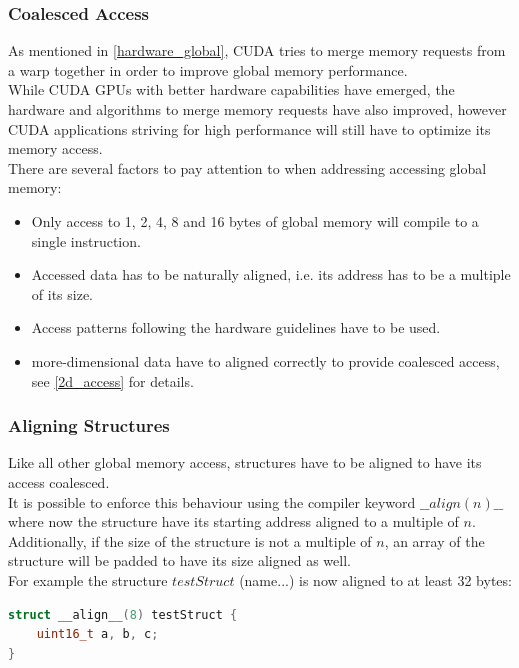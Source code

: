 \subsubsection{Coalesced Access}
As mentioned in \ref{hardware_global}, CUDA tries to merge memory requests from a warp together in order to improve global memory performance.\\
While CUDA GPUs with better hardware capabilities have emerged, the hardware and algorithms to merge memory requests have also improved,
however CUDA applications striving for high performance will still have to optimize its memory access.\\
There are several factors to pay attention to when addressing accessing global memory:\\
\begin{itemize}
    \item Only access to 1, 2, 4, 8 and 16 bytes of global memory will compile to a single instruction.
    \item Accessed data has to be naturally aligned, i.e. its address has to be a multiple of its size.
    \item Access patterns following the hardware guidelines have to be used.
    \item more-dimensional data have to aligned correctly to provide coalesced access, see \ref{2d_access} for details.
\end{itemize}

\subsubsection{Aligning Structures}
Like all other global memory access, structures have to be aligned to have its access coalesced.\\
It is possible to enforce this behaviour using the compiler keyword  $\_\_align(n)\_\_$
where now the structure have its starting address aligned to a multiple of $n$.\\
Additionally, if the size of the structure is not a multiple of $n$, an array of the structure will be padded to have its size aligned as well.\\
For example the structure $testStruct$ (name...) is now aligned to at least 32 bytes:\\
\begin{lstlisting}[language=c]
struct __align__(8) testStruct {
    uint16_t a, b, c;
}
\end{lstlisting}

